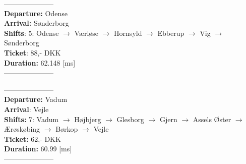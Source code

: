 \documentclass[10pt,a4paper]{article}
\begin{document}
--------------------- \\
\textbf{Departure:} Odense \\
\textbf{Arrival: }  Sønderborg \\ 
\textbf{Shifts}:    5: Odense $\rightarrow$ Værløse $\rightarrow$ Hornsyld $\rightarrow$ Ebberup $\rightarrow$ Vig $\rightarrow$ Sønderborg \\
\textbf{Ticket}:    88,- DKK \\
\textbf{Duration:}  62.148 [ms] \\
---------------------


---------------------\\
\textbf{Departure:} Vadum\\
\textbf{Arrival}:   Vejle\\
\textbf{Shifts:}    7: Vadum $\rightarrow$ Højbjerg $\rightarrow$ Glesborg $\rightarrow$ Gjern $\rightarrow$ Assels Øster $\rightarrow$ Ærøskøbing $\rightarrow$ Børkop $\rightarrow$ Vejle \\
\textbf{Ticket:}    62,- DKK \\
\textbf{Duration:}  60.99 [ms] \\
--------------------- \\
\end{document}
